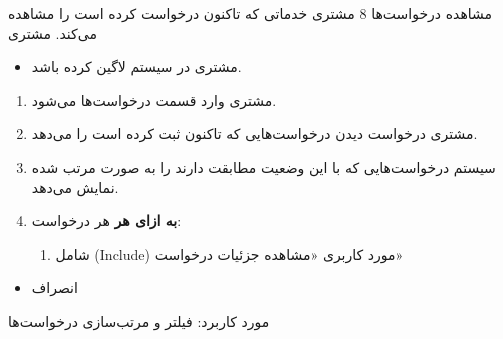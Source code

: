 {
\usecase
{مشاهده درخواست‌ها}
{8}
{مشتری خدماتی که تاکنون درخواست کرده است را مشاهده می‌کند.}
{مشتری}
{}
{	
	\begin{itemize}
		\vspace*{-0.6cm}
		\item 
		مشتری در سیستم لاگین کرده باشد.
	\end{itemize}
}
{
	\vspace*{-0.6cm}
	\begin{enumerate}
		\item 
		مشتری وارد قسمت درخواست‌ها می‌شود.
		\item
		مشتری درخواست دیدن درخواست‌هایی که تاکنون ثبت کرده است را می‌دهد.
		\item
		سیستم درخواست‌هایی که با این وضعیت مطابقت دارند را به صورت مرتب شده نمایش می‌دهد.
		
		\item
		\textbf{به ازای هر} هر درخواست:
		
		\begin{enumerate}[label=\theenumi.\arabic*.]
			\item
			شامل (Include) مورد کاربری «مشاهده جزئیات درخواست»
		\end{enumerate}
	\end{enumerate}
}
{}
{
	\begin{itemize}
		\item
		انصراف
	\end{itemize}
}
{
	مورد کاربرد: فیلتر و مرتب‌سازی درخواست‌ها
}

}


